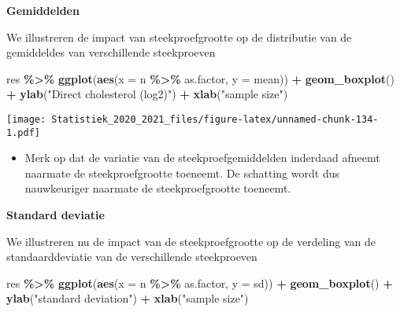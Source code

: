 \documentclass[
  12pt,dutch,coursenotes]{book}
\newenvironment{Shaded}{\begin{snugshade}}{\end{snugshade}}
\newcommand{\DataTypeTok}[1]{\textcolor[rgb]{0.13,0.29,0.53}{#1}}
\newcommand{\KeywordTok}[1]{\textcolor[rgb]{0.13,0.29,0.53}{\textbf{#1}}}
\newcommand{\NormalTok}[1]{#1}
\newcommand{\OperatorTok}[1]{\textcolor[rgb]{0.81,0.36,0.00}{\textbf{#1}}}
\newcommand{\StringTok}[1]{\textcolor[rgb]{0.31,0.60,0.02}{#1}}
\providecommand{\tightlist}{%
  \setlength{\itemsep}{0pt}\setlength{\parskip}{0pt}}
\theoremstyle{definition}
\theoremstyle{definition}
\theoremstyle{definition}
\theoremstyle{remark}
\begin{document}
\textbf{Gemiddelden}

We illustreren de impact van steekproefgrootte op de distributie van de gemiddeldes van verschillende steekproeven

\begin{Shaded}
\begin{Highlighting}[]
\NormalTok{res }\OperatorTok{\%\textgreater{}\%}\StringTok{ }\KeywordTok{ggplot}\NormalTok{(}\KeywordTok{aes}\NormalTok{(}\DataTypeTok{x =}\NormalTok{ n }\OperatorTok{\%\textgreater{}\%}\StringTok{ }\NormalTok{as.factor, }\DataTypeTok{y =}\NormalTok{ mean)) }\OperatorTok{+}\StringTok{ }
\StringTok{    }\KeywordTok{geom\_boxplot}\NormalTok{() }\OperatorTok{+}\StringTok{ }\KeywordTok{ylab}\NormalTok{(}\StringTok{"Direct cholesterol (log2)"}\NormalTok{) }\OperatorTok{+}\StringTok{ }
\StringTok{    }\KeywordTok{xlab}\NormalTok{(}\StringTok{"sample size"}\NormalTok{)}
\end{Highlighting}
\end{Shaded}

\texttt{[image: Statistiek\_2020\_2021\_files/figure-latex/unnamed-chunk-134-1.pdf]}

\begin{itemize}
\tightlist
\item
  Merk op dat de variatie van de steekproefgemiddelden inderdaad afneemt naarmate de steekproefgrootte toeneemt. De schatting wordt dus nauwkeuriger naarmate de steekproefgrootte toeneemt.
\end{itemize}

\textbf{Standard deviatie}

We illustreren nu de impact van de steekproefgrootte op de verdeling van de standaarddeviatie van de verschillende steekproeven

\begin{Shaded}
\begin{Highlighting}[]
\NormalTok{res }\OperatorTok{\%\textgreater{}\%}\StringTok{ }\KeywordTok{ggplot}\NormalTok{(}\KeywordTok{aes}\NormalTok{(}\DataTypeTok{x =}\NormalTok{ n }\OperatorTok{\%\textgreater{}\%}\StringTok{ }\NormalTok{as.factor, }\DataTypeTok{y =}\NormalTok{ sd)) }\OperatorTok{+}\StringTok{ }
\StringTok{    }\KeywordTok{geom\_boxplot}\NormalTok{() }\OperatorTok{+}\StringTok{ }\KeywordTok{ylab}\NormalTok{(}\StringTok{"standard deviation"}\NormalTok{) }\OperatorTok{+}\StringTok{ }\KeywordTok{xlab}\NormalTok{(}\StringTok{"sample size"}\NormalTok{)}
\end{Highlighting}
\end{Shaded}
\end{document}
